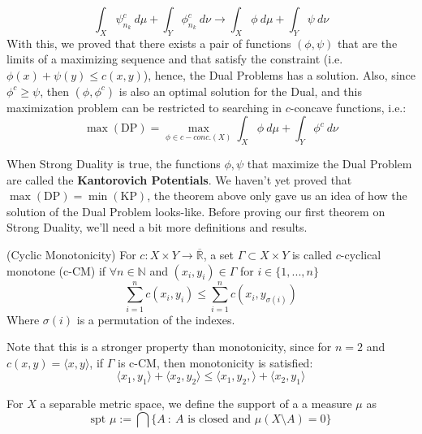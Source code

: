 \begin{prf}
  \begin{equation*}
    \int_X \psi_{n_k}^c \ d\mu +
    \int_Y \phi_{n_k}^c \ d\nu
    \to
    \int_X \phi \ d\mu +
    \int_Y \psi \ d\nu
  \end{equation*}
  With this, we proved that there exists a pair of functions
  $(\phi, \psi)$ that are the limits of a maximizing sequence and that
  satisfy the constraint (i.e. $\phi(x)+\psi(y) \leq c(x,y)$), hence,
  the Dual Problems has a solution. Also, since $\phi^c \geq \psi$,
  then $(\phi,\phi^c)$ is also an optimal solution for the Dual, and this maximization
  problem can be restricted to searching in $c$-concave functions, i.e.:
  \begin{equation*}
    \max(\mathrm{DP}) =
    \max_{\phi \in c-conc.(X)} \int_X \phi \ d\mu +
    \int_Y \phi^c \ d\nu
  \end{equation*}
\end{prf}

\vspace{5mm}

When Strong Duality is true, the functions $\phi, \psi$ that maximize the Dual Problem
are called the \textbf{Kantorovich Potentials}.
We haven't yet proved that $\mathrm{\max(DP)}=\mathrm{\min(KP)}$, the theorem above
only gave us an idea of how the solution of the Dual Problem looks-like. Before proving
our first theorem on Strong Duality, we'll need a bit more definitions
and results.

\begin{definition}(Cyclic Monotonicity)
  For $c:X \times Y \to \overline{\mathbb R}$, a set $\Gamma \subset
    X \times Y$ is called $c$-cyclical monotone (c-CM) if
  $\forall n \in \mathbb N$ and $(x_i,y_i) \in \Gamma$ for
  $i \in \{1,...,n\}$
  \begin{equation}
    \sum^n_{i=1}c(x_i,y_i) \leq
    \sum^n_{i=1} c(x_i,y_{\sigma(i)})
  \end{equation}
  Where $\sigma(i)$ is a permutation of the indexes.
  \label{def:cyclic-monotonicity}
\end{definition}
Note that
this is a stronger property than monotonicity, since for
$n=2$ and $c(x,y) = \langle x, y \rangle$, if $\Gamma$ is c-CM,
then monotonicity is satisfied:
\begin{equation}
  \langle x_1,y_1 \rangle + \langle x_2, y_2 \rangle \leq
  \langle x_1, y_2, \rangle + \langle x_2, y_1 \rangle
\end{equation}

\begin{definition}
  For $X$	a separable metric space, we define the support of a
  a measure $\mu$ as
  \begin{equation}
    \text{spt } \mu := \bigcap
    \{
    A \ : \ A \text{ is closed and } \mu(X\setminus A) =0
    \}
  \end{equation}
\end{definition}

